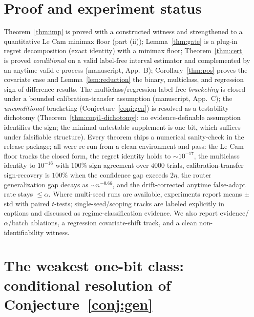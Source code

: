 \documentclass[conference]{IEEEtran}
\theoremstyle{plain}
\theoremstyle{definition}
\begin{document}
\section{Proof and experiment status}\label{app:status}
Theorem~\ref{thm:imp} is proved with a constructed witness and strengthened to a quantitative Le
Cam minimax floor (part (ii)); Lemma~\ref{thm:gate} is a plug-in regret
decomposition (exact identity) with a minimax floor; Theorem~\ref{thm:cert} is proved
\emph{conditional} on a valid label-free interval estimator and complemented by an anytime-valid
e-process (manuscript, App.~B); Corollary~\ref{thm:pos} proves the covariate case and
Lemma~\ref{lem:reduction} the binary, multiclass, and regression
sign-of-difference results. The multiclass/regression label-free \emph{bracketing} is closed under
a bounded calibration-transfer assumption (manuscript, App.~C); the \emph{unconditional}
bracketing (Conjecture~\ref{conj:gen}) is resolved as a testability dichotomy
(Theorem~\ref{thm:conj1-dichotomy}: no evidence-definable assumption identifies the
sign; the minimal untestable supplement is one bit, which suffices under falsifiable
structure). Every theorem ships a
numerical sanity-check in the release package; all were re-run
from a clean environment and pass: the Le Cam floor tracks the closed form, the regret identity
holds to ${\sim}10^{-17}$, the multiclass identity to $10^{-16}$ with $100\%$ sign agreement over
$4000$ trials, calibration-transfer sign-recovery is $100\%$ when the confidence gap exceeds
$2\eta$, the router generalization gap decays as ${\sim}n^{-0.66}$, and the drift-corrected anytime
false-adapt rate stays $\le\alpha$. Where multi-seed runs are available, experiments report means
$\pm$ std with paired $t$-tests; single-seed/scoping tracks are labeled explicitly in captions and
discussed as regime-classification evidence. We also report evidence/$\alpha$/batch ablations, a
regression covariate-shift track, and a clean
non-identifiability witness.



\section{The weakest one-bit class: conditional resolution of Conjecture~\ref{conj:gen}}\label{app:weakest}







\newcommand{\IncludeAuditableRefs}{}

\end{document}
